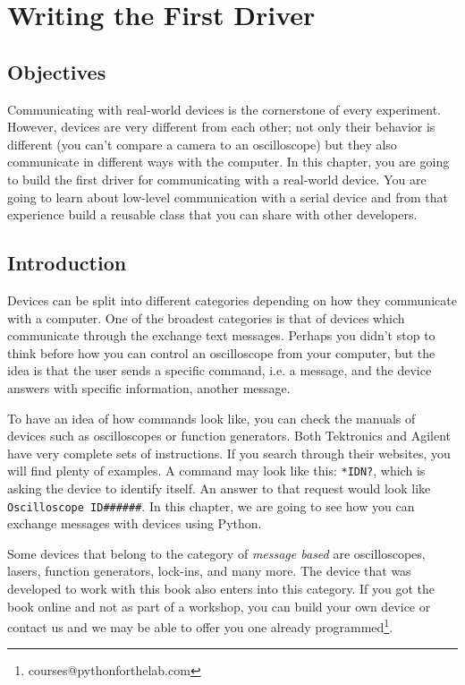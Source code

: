 \chapter{Writing the First Driver}\label{chapter:controller}
\section{Objectives}
Communicating with real-world devices is the cornerstone of every
experiment. However, devices are very different from each other; not
only their behavior is different (you can't compare a camera to an oscilloscope) 
but they also communicate in different ways with the computer. In this chapter, 
you are going to build the first driver for
communicating with a real-world device. You are going to learn about
low-level communication with a serial device and from that experience
build a reusable class that you can share with other developers. 

\section{Introduction}
Devices can be split into different categories depending on how they
communicate with a computer. One of the broadest categories is that of devices which communicate through the exchange text messages. Perhaps you didn't stop to think before how you can control an oscilloscope from your computer, but the idea is that the user sends
a specific command, i.e. a message, and the device answers with specific information, another message. 

To have an idea of how commands look like, you can check the manuals of devices such as oscilloscopes or function generators. Both Tektronics and Agilent have very complete sets of instructions. If you search through their websites, you will find plenty of examples. A command may look like this: 
\texttt{*IDN?}, which is asking the device to identify itself. An 
answer to that request would look like \texttt{Oscilloscope ID######}. 
In this chapter, we are going to see how you can exchange messages with devices 
using Python.

Some devices that belong to the category of \textit{message based} are oscilloscopes, lasers,
function generators, lock-ins, and many more. The device that was developed to work with this book also enters into this category. If you got the book online and not as part of a workshop, you can build your own device or contact us and we may be able to offer you one already 
programmed\footnote{courses@pythonforthelab.com}.


